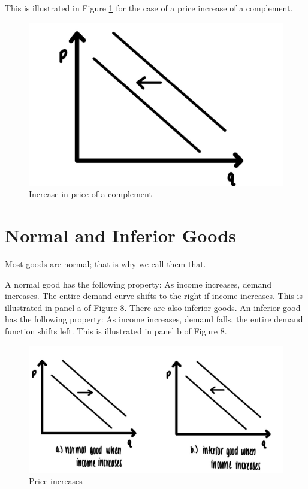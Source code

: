 \documentclass[
]{book}
\begin{document}
This is illustrated in Figure \ref{fig:demand08} for the case of a price increase of a complement.

\begin{figure}

{\centering \includegraphics[width=0.75\linewidth]{img/demand/fig8} 

}

\caption{Increase in price of a complement}\label{fig:demand08}
\end{figure}

\hypertarget{normal-and-inferior-goods}{%
\section{Normal and Inferior Goods}\label{normal-and-inferior-goods}}

Most goods are normal; that is why we call them that.

A normal good has the following property: As income increases, demand increases. The entire demand curve shifts to the right if income increases. This is illustrated in panel a of Figure 8. There are also inferior goods. An inferior good has the following property: As income increases, demand falls, the entire demand function shifts left. This is illustrated in panel b of Figure 8.

\begin{figure}

{\centering \includegraphics[width=1\linewidth]{img/demand/fig9} 

}

\caption{Price increases}\label{fig:demand09}
\end{figure}
\end{document}
